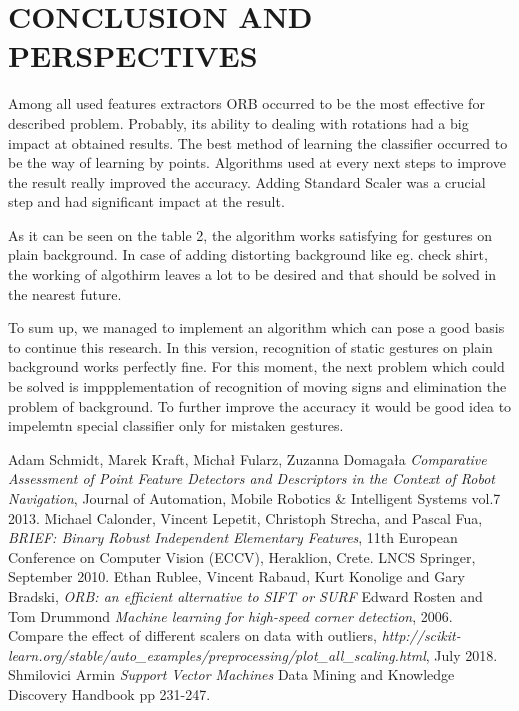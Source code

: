 \documentclass[11pt,a4paper]{article}
\begin{document}
\section{CONCLUSION AND PERSPECTIVES}

Among all used features extractors ORB occurred to be the most effective for described problem. Probably, its ability to dealing with rotations had a big impact at obtained results. The best method of learning the classifier occurred to be the way of learning by points. Algorithms used at every next steps to improve the result really improved the accuracy. Adding Standard Scaler was a crucial step and had significant impact at the result.

As it can be seen on the table 2, the algorithm works satisfying for gestures on plain background. In case of adding distorting background like eg. check shirt, the working of algothirm leaves a lot to be desired and that should be solved in the nearest future.

To sum up, we managed to implement an algorithm which can pose a good basis to continue this research. In this version, recognition of static gestures on plain background works perfectly fine. For this moment, the next problem which could be solved is imppplementation of recognition of moving signs and elimination the problem of background. To further improve the accuracy it would be good idea to impelemtn special classifier only for mistaken gestures.





\begin{thebibliography}{99}
 \setlength\baselineskip{5pt}
%

Adam Schmidt, Marek Kraft, Micha\l $ $ Fularz, Zuzanna Domaga\l a 
\textit{Comparative Assessment of Point Feature Detectors and Descriptors in the Context of Robot Navigation},
Journal of Automation, Mobile Robotics \& Intelligent Systems vol.7 2013.
Michael Calonder, Vincent Lepetit, Christoph Strecha, and Pascal Fua, 
\textit{BRIEF: Binary Robust Independent Elementary Features}, 11th European Conference on Computer Vision (ECCV), Heraklion, Crete. LNCS Springer, September 2010.
Ethan Rublee, Vincent Rabaud, Kurt Konolige and Gary Bradski, 
\textit{ORB: an efficient alternative to SIFT or SURF}
 Edward Rosten and Tom Drummond
\textit{Machine learning for high-speed corner detection},
 2006.
Compare the effect of different scalers on data with outliers,
\textit{http://scikit-learn.org/stable/auto\_examples/preprocessing/plot\_all\_scaling.html},
July 2018.
 Shmilovici Armin \textit{Support Vector Machines} Data Mining and Knowledge Discovery Handbook pp 231-247.


\end{thebibliography}
\end{document}
